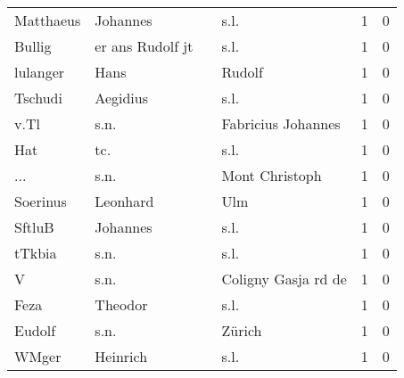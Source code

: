\begin{tabular}{llllrr}
                Matthaeus &                           Johannes &             &                                        s.l. &          1 &         0 \\
                   Bullig &                   er ans Rudolf jt &             &                                        s.l. &          1 &         0 \\
                 lulanger &                               Hans &             &                                      Rudolf &          1 &         0 \\
                  Tschudi &                           Aegidius &             &                                        s.l. &          1 &         0 \\
                     v.Tl &                               s.n. &             &                          Fabricius Johannes &          1 &         0 \\
                      Hat &                                tc. &             &                                        s.l. &          1 &         0 \\
                      ... &                               s.n. &             &                              Mont Christoph &          1 &         0 \\
                 Soerinus &                           Leonhard &             &                                         Ulm &          1 &         0 \\
                   SftluB &                           Johannes &             &                                        s.l. &          1 &         0 \\
                   tTkbia &                               s.n. &             &                                        s.l. &          1 &         0 \\
                        V &                               s.n. &             &                         Coligny Gasja rd de &          1 &         0 \\
                     Feza &                            Theodor &             &                                        s.l. &          1 &         0 \\
                   Eudolf &                               s.n. &             &                                      Zürich &          1 &         0 \\
                    WMger &                           Heinrich &             &                                        s.l. &          1 &         0 \\

\end{tabular}
